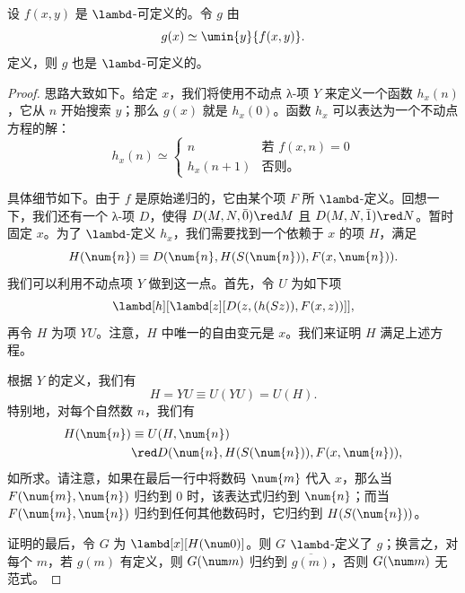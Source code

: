 \documentclass[../../../include/open-logic-section]{subfiles}
\begin{document}

\begin{lem}
设 $f(x,y)$ 是 $\lambd$-可定义的。令 $g$ 由
\[
g(x) \simeq \umin{y}{f(x,y)}.
\]
定义，则 $g$ 也是 $\lambd$-可定义的。
\end{lem}

\begin{proof}
思路大致如下。给定 $x$，我们将使用不动点 λ-项 $Y$ 来定义一个函数 $h_x(n)$，它从 $n$ 开始搜索 $y$；那么 $g(x)$ 就是 $h_x(0)$。函数 $h_x$ 可以表达为一个不动点方程的解：
\[
h_x(n) \simeq
\begin{cases}
n & \text{若 $f(x,n) = 0$} \\
h_x(n+1) & \text{否则。}
\end{cases}
\]

具体细节如下。由于 $f$ 是原始递归的，它由某个项 $F$ 所 $\lambd$-定义。回想一下，我们还有一个 λ-项 $D$，使得 $D(M, N, \bar{0}) \red M$ 且 $D(M, N, \bar{1})
\red N$。暂时固定 $x$。为了 $\lambd$-定义 $h_x$，我们需要找到一个依赖于 $x$ 的项 $H$，满足
\[
H(\num{n}) \equiv D(\num{n}, H(S(\num{n})), F(x, \num{n})).
\]
我们可以利用不动点项 $Y$ 做到这一点。首先，令 $U$ 为如下项
\[
\lambd[h][\lambd[z][D(z,(h(Sz)),F(x,z))]],
\]
再令 $H$ 为项 $YU$。注意，$H$ 中唯一的自由变元是 $x$。我们来证明 $H$ 满足上述方程。

根据 $Y$ 的定义，我们有
\[
H = YU \equiv U(YU) = U(H).
\]
特别地，对每个自然数 $n$，我们有
\begin{align*}
H(\num{n}) & \equiv U(H, \num{n}) \\
& \red D(\num{n}, H(S(\num{n})), F(x, \num{n})),
\end{align*}
如所求。请注意，如果在最后一行中将数码 $\num{m}$ 代入 $x$，那么当 $F(\num{m},
\num{n})$ 归约到 $\num{0}$ 时，该表达式归约到 $\num{n}$；而当 $F(\num{m}, \num{n})$ 归约到任何其他数码时，它归约到 $H(S(\num{n}))$。

证明的最后，令 $G$ 为 $\lambd[x][H(\num 0)]$。则 $G$ $\lambd$-定义了 $g$；换言之，对每个 $m$，若 $g(m)$ 有定义，则 $G(\num m)$ 归约到 $\overline {g(m)}$，否则 $G(\num m)$ 无范式。
\end{proof}
\end{document}
